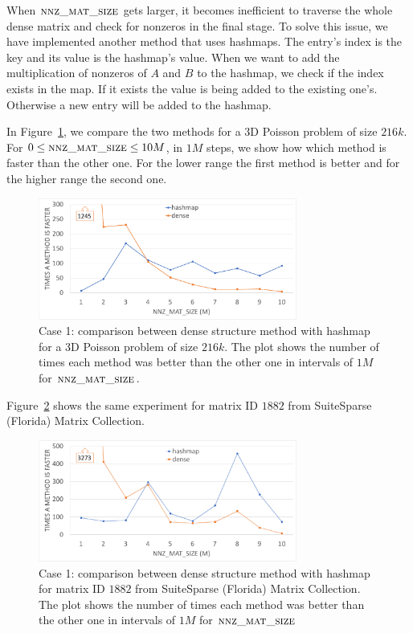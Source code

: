 When $\textsc{nnz\_mat\_size}$ gets larger, it becomes inefficient to traverse the whole dense matrix and check for nonzeros in the final stage. To solve this issue, we have implemented another method that uses hashmaps. The entry's index is the key and its value is the hashmap's value. When we want to add the multiplication of nonzeros of $A$ and $B$ to the hashmap, we check if the index exists in the map. If it exists the value is being added to the existing one's. Otherwise a new entry will be added to the hashmap.

In Figure~\ref{fig:lap60}, we compare the two methods for a 3D Poisson problem of size $216k$. For $0 \leq \textsc{nnz\_mat\_size} \leq 10M$, in $1M$ steps, we show how which method is faster than the other one. For the lower range the first method is better and for the higher range the second one.

\begin{figure}[tbh]
 \centering
 \includegraphics[width=8.5cm,height=4cm]{./figures/lap60_range.pdf}
 \caption{Case 1: comparison between dense structure method with hashmap for a 3D Poisson problem of size $216k$. The plot shows the number of times each method was better than the other one in intervals of $1M$ for $\textsc{nnz\_mat\_size}$.}
 \label{fig:lap60}
\end{figure}

Figure~\ref{fig:eco} shows the same experiment for matrix ID $1882$ from SuiteSparse (Florida) Matrix Collection.

\begin{figure}[tbh]
 \centering
 \includegraphics[width=8.5cm,height=4cm]{./figures/eco_range.pdf}
 \caption{Case 1: comparison between dense structure method with hashmap for matrix ID $1882$ from SuiteSparse (Florida) Matrix Collection. The plot shows the number of times each method was better than the other one in intervals of $1M$ for $\textsc{nnz\_mat\_size}$}
 \label{fig:eco}
\end{figure}

